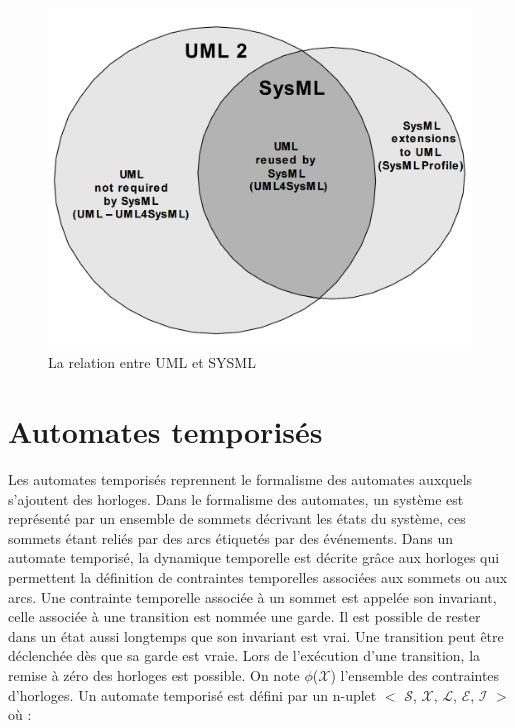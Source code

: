 \documentclass[french]{spimufcphdthesis}
\begin{document}
\begin{figure}[H]
\begin{center}
\includegraphics[scale=0.2]{figures/relationshipUS.png}
\caption{La relation entre UML et SYSML}
\label{relationUS}
\end{center}
\end{figure}

\section{Automates temporisés}

 Les automates temporisés reprennent
le formalisme des automates auxquels s’ajoutent des horloges. Dans le formalisme des automates, un système est représenté par un ensemble de sommets décrivant les états du système, ces sommets étant reliés par des arcs étiquetés par des événements.
Dans un automate temporisé, la dynamique temporelle est décrite grâce aux horloges qui permettent la définition de contraintes temporelles associées aux sommets ou aux
arcs. Une contrainte temporelle associée à un sommet est appelée son invariant, celle associée à une transition est nommée une garde. Il est possible de rester dans un état
aussi longtemps que son invariant est vrai. Une transition peut être déclenchée dès que sa garde est vraie. Lors de l’exécution d’une transition, la remise à zéro des horloges
est possible.
On note $\mathcal{\phi}$($\mathcal{X}$) l’ensemble des contraintes d’horloges. Un automate temporisé est défini par un n-uplet $\mathcal{<}$
$\mathcal{S}$, $\mathcal{X}$, $\mathcal{L}$, $\mathcal{E}$, $\mathcal{I}$ $\mathcal{>}$ où :
\end{document}

